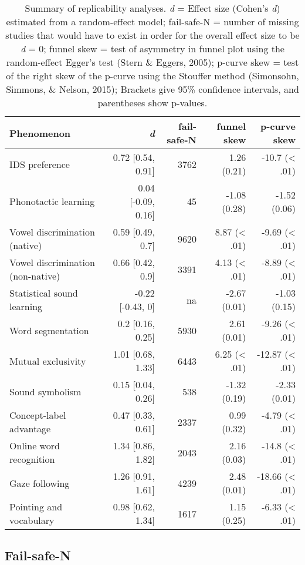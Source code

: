 \documentclass[english,floatsintext,man]{apa6}
\begin{document}
\begin{table}[t]
\footnotesize
\begin{tabular}{lrrrr}
\toprule
\textbf{Phenomenon} & \textbf{\textit{d}} & \textbf{fail-safe-N} & \textbf{funnel skew} & \textbf{p-curve skew}\\
\midrule

IDS preference & 0.72 [0.54, 0.91] & 3762 & 1.26 (0.21) & -10.7 (< .01)\\
Phonotactic learning & 0.04 [-0.09, 0.16] & 45 & -1.08 (0.28) & -1.52 (0.06)\\
Vowel discrimination (native) & 0.59 [0.49, 0.7] & 9620 & 8.87 (< .01) & -9.69 (< .01)\\
Vowel discrimination (non-native) & 0.66 [0.42, 0.9] & 3391 & 4.13 (< .01) & -8.89 (< .01)\\
Statistical sound learning & -0.22 [-0.43, 0] & na & -2.67 (0.01) & -1.03 (0.15)\\
Word segmentation & 0.2 [0.16, 0.25] & 5930 & 2.61 (0.01) & -9.26 (< .01)\\
Mutual exclusivity & 1.01 [0.68, 1.33] & 6443 & 6.25 (< .01) & -12.87 (< .01)\\
Sound symbolism & 0.15 [0.04, 0.26] & 538 & -1.32 (0.19) & -2.33 (0.01)\\
Concept-label advantage & 0.47 [0.33, 0.61] & 2337 & 0.99 (0.32) & -4.79 (< .01)\\
Online word recognition & 1.34 [0.86, 1.82] & 2043 & 2.16 (0.03) & -14.8 (< .01)\\
Gaze following & 1.26 [0.91, 1.61] & 4239 & 2.48 (0.01) & -18.66 (< .01)\\
Pointing and vocabulary & 0.98 [0.62, 1.34] & 1617 & 1.15 (0.25) & -6.33 (< .01)\\

\bottomrule
\end{tabular}
\caption{Summary of replicability analyses. \textit{d} = Effect size (Cohen's {\it d}) estimated from a random-effect model; fail-safe-N = number of missing studies that would have to exist in order for the overall effect size to be {\it d} = 0; funnel skew = test of asymmetry in funnel plot using the random-effect Egger's test (Stern \& Eggers, 2005); p-curve skew = test of the right skew of the p-curve using the Stouffer method (Simonsohn, Simmons, \& Nelson, 2015); Brackets give 95\% confidence intervals, and parentheses show p-values.}
\end{table}

\subsection{Fail-safe-N}\label{fail-safe-n}
\end{document}
